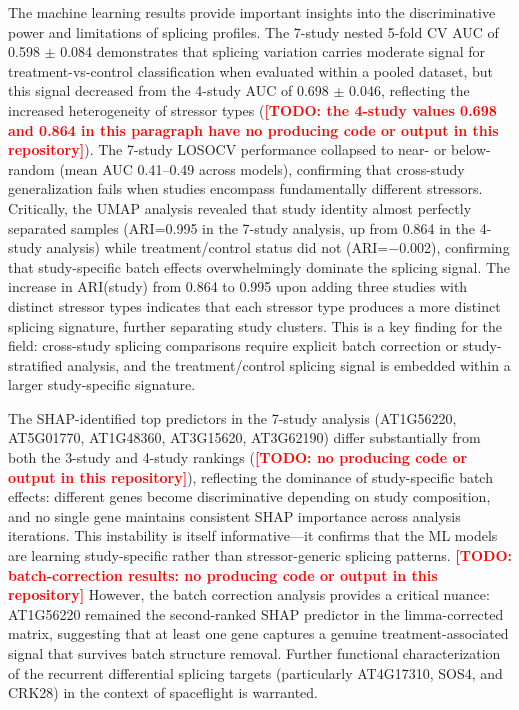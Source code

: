 \documentclass[12pt,a4paper]{article}
\newcommand{\TODO}[1]{\textcolor{red}{\textbf{[TODO: #1]}}}
\begin{document}
The machine learning results provide important insights into the discriminative power and limitations of splicing profiles. The 7-study nested 5-fold CV AUC of 0.598 $\pm$ 0.084 demonstrates that splicing variation carries moderate signal for treatment-vs-control classification when evaluated within a pooled dataset, but this signal decreased from the 4-study AUC of 0.698 $\pm$ 0.046, reflecting the increased heterogeneity of stressor types (\TODO{the 4-study values 0.698 and 0.864 in this paragraph have no producing code or output in this repository}). The 7-study LOSOCV performance collapsed to near- or below-random (mean AUC 0.41--0.49 across models), confirming that cross-study generalization fails when studies encompass fundamentally different stressors. Critically, the UMAP analysis revealed that study identity almost perfectly separated samples (ARI=0.995 in the 7-study analysis, up from 0.864 in the 4-study analysis) while treatment/control status did not (ARI=$-$0.002), confirming that study-specific batch effects overwhelmingly dominate the splicing signal. The increase in ARI(study) from 0.864 to 0.995 upon adding three studies with distinct stressor types indicates that each stressor type produces a more distinct splicing signature, further separating study clusters. This is a key finding for the field: cross-study splicing comparisons require explicit batch correction or study-stratified analysis, and the treatment/control splicing signal is embedded within a larger study-specific signature.

The SHAP-identified top predictors in the 7-study analysis (AT1G56220, AT5G01770, AT1G48360, AT3G15620, AT3G62190) differ substantially from both the 3-study and 4-study rankings (\TODO{no producing code or output in this repository}), reflecting the dominance of study-specific batch effects: different genes become discriminative depending on study composition, and no single gene maintains consistent SHAP importance across analysis iterations. This instability is itself informative---it confirms that the ML models are learning study-specific rather than stressor-generic splicing patterns. \TODO{batch-correction results: no producing code or output in this repository} However, the batch correction analysis provides a critical nuance: AT1G56220 remained the second-ranked SHAP predictor in the limma-corrected matrix, suggesting that at least one gene captures a genuine treatment-associated signal that survives batch structure removal. Further functional characterization of the recurrent differential splicing targets (particularly AT4G17310, SOS4, and CRK28) in the context of spaceflight is warranted.
\end{document}
